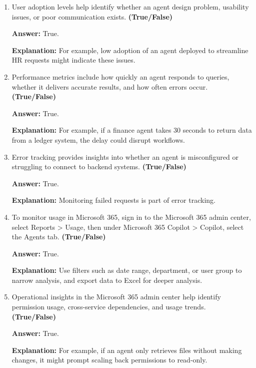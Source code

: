 \documentclass[10pt]{article}
\begin{document}
\begin{enumerate}[leftmargin=*]
\textbf{Answer:} True.

\textbf{Explanation:} Admins must know how frequently an agent is being used, who is using it, and whether it’s performing efficiently.

\item User adoption levels help identify whether an agent design problem, usability issues, or poor communication exists. \textbf{(True/False)}

\textbf{Answer:} True.

\textbf{Explanation:} For example, low adoption of an agent deployed to streamline HR requests might indicate these issues.

\item Performance metrics include how quickly an agent responds to queries, whether it delivers accurate results, and how often errors occur. \textbf{(True/False)}

\textbf{Answer:} True.

\textbf{Explanation:} For example, if a finance agent takes 30 seconds to return data from a ledger system, the delay could disrupt workflows.

\item Error tracking provides insights into whether an agent is misconfigured or struggling to connect to backend systems. \textbf{(True/False)}

\textbf{Answer:} True.

\textbf{Explanation:} Monitoring failed requests is part of error tracking.

\item To monitor usage in Microsoft 365, sign in to the Microsoft 365 admin center, select Reports > Usage, then under Microsoft 365 Copilot > Copilot, select the Agents tab. \textbf{(True/False)}

\textbf{Answer:} True.

\textbf{Explanation:} Use filters such as date range, department, or user group to narrow analysis, and export data to Excel for deeper analysis.

\item Operational insights in the Microsoft 365 admin center help identify permission usage, cross-service dependencies, and usage trends. \textbf{(True/False)}

\textbf{Answer:} True.

\textbf{Explanation:} For example, if an agent only retrieves files without making changes, it might prompt scaling back permissions to read-only.


\end{enumerate}
\end{document}
